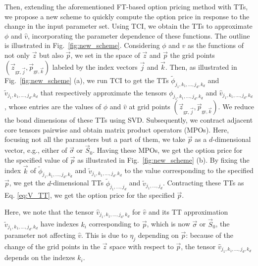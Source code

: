 Then, extending the aforementioned FT-based option pricing method with TTs, we propose a new scheme to quickly compute the option price in response to the change in the input parameter set.
Using TCI, we obtain the TTs to approximate $\phi$ and $\hat{v}$, incorporating the parameter dependence of these functions.
The outline is illustrated in Fig.~\ref{fig:new_scheme}.
Considering $\phi$ and $\hat{v}$ as the functions of not only $\vec{z}$ but also $\vec{p}$, we set in the space of $\vec{z}$ and $\vec{p}$ the grid points $(\vec{z}_{\mathrm{gr},\vec{j}},\vec{p}_{\mathrm{gr},\vec{k}})$ labeled by the index vectors $\vec{j}$ and $\vec{k}$.
Then, as illustrated in Fig.~\ref{fig:new_scheme} (a), we run TCI to get the TTs $\tilde{\phi}_{j_1,k_1,\ldots,j_d,k_d}$ and $\tilde{v}_{j_1,k_1,\ldots,j_d,k_d}$ that respectively approximate the tensors $\phi_{j_1,k_1,\ldots,j_d,k_d}$ and $\hat{v}_{j_1,k_1,\ldots,j_d,k_d}$, whose entries are the values of $\phi$ and $\hat{v}$ at grid points $(\vec{z}_{\mathrm{gr},\vec{j}},\vec{p}_{\mathrm{gr},\vec{k}})$.
We reduce the bond dimensions of these TTs using SVD. 
Subsequently, we contract adjacent core tensors pairwise and obtain matrix product operators (MPOs).
Here, focusing not all the parameters but a part of them, we take $\vec{p}$ as a $d$-dimensional vector, e.g., either of $\vec{\sigma}$ or $\vec{S}_0$.
Having these MPOs, we get the option price for the specified value of $\vec{p}$ as illustrated in Fig.~\ref{fig:new_scheme} (b).
By fixing the index $\vec{k}$ of $\tilde{\phi}_{j_1,k_1,\ldots,j_d,k_d}$ and $\tilde{v}_{j_1,k_1,\ldots,j_d,k_d}$ to the value corresponding to the specified $\vec{p}$, we get the $d$-dimensional TTs $\tilde{\phi}_{j_1,\ldots,j_d}$ and $\tilde{v}_{j_1,\ldots,j_d}$.
Contracting these TTs as Eq. \eqref{eq:V_TT}, we get the option price for the specified $\vec{p}$.

Here, we note that the tensor $\hat{v}_{j_1,k_1,\ldots,j_d,k_d}$ for $\hat{v}$ and its TT approximation $\tilde{v}_{j_1,k_1,\ldots,j_d,k_d}$ have indexes $k_i$ corresponding to $\vec{p}$, which is now $\vec{\sigma}$ or $\vec{S}_0$, the parameter not affecting $\hat{v}$.
This is due to $\eta_j$ depending on $\vec{p}$: because of the change of the grid points in the $\vec{z}$ space with respect to $\vec{p}$, the tensor $\hat{v}_{j_1,k_1,\ldots,j_d,k_d}$ depends on the indexes $k_i$.

